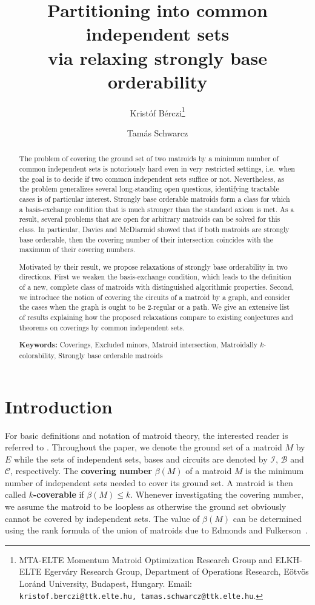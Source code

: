 \documentclass[11pt,a4paper]{article}
\title{Partitioning into common independent sets\\ via relaxing strongly base orderability}
\author{
Kristóf Bérczi\thanks{MTA-ELTE Momentum Matroid Optimization Research Group and ELKH-ELTE Egerváry Research Group, Department of Operations Research, Eötvös Loránd University, Budapest, Hungary. Email: \texttt{kristof.berczi@ttk.elte.hu, tamas.schwarcz@ttk.elte.hu}.}
\and
Tamás Schwarcz\footnotemark[1]
}
\date{}
\theoremstyle{plain}
\theoremstyle{definition}
\newcommand{\cB}{\mathcal{B}}
\newcommand{\cI}{\mathcal{I}}
\newcommand{\cC}{\mathcal{C}}
\begin{document}
\maketitle

\begin{abstract}

The problem of covering the ground set of two matroids by a minimum number of common independent sets is notoriously hard even in very restricted settings, i.e.\ when the goal is to decide if two common independent sets suffice or not. Nevertheless, as the problem generalizes several long-standing open questions, identifying tractable cases is of particular interest. Strongly base orderable matroids form a class for which a basis-exchange condition that is much stronger than the standard axiom is met. As a result, several problems that are open for arbitrary matroids can be solved for this class. In particular, Davies and McDiarmid showed that if both matroids are strongly base orderable, then the covering number of their intersection coincides with the maximum of their covering numbers.

Motivated by their result, we propose relaxations of strongly base orderability in two directions. First we weaken the basis-exchange condition, which leads to the definition of a new, complete class of matroids with distinguished algorithmic properties. Second, we introduce the notion of covering the circuits of a matroid by a graph, and consider the cases when the graph is ought to be 2-regular or a path. We give an extensive list of results explaining how the proposed relaxations compare to existing conjectures and theorems on coverings by common independent sets. 
   
    \medskip

\noindent \textbf{Keywords:} Coverings, Excluded minors, Matroid intersection, Matroidally $k$-colorability, Strongly base orderable matroids
    
\end{abstract}


\section{Introduction} 
\label{sec:intro}

For basic definitions and notation of matroid theory, the interested reader is referred to \cite{oxley2011matroid}. Throughout the paper, we denote the ground set of a matroid $M$ by $E$ while the sets of independent sets, bases and circuits are denoted by $\cI$, $\cB$ and $\cC$, respectively. The \textbf{covering number} $\beta(M)$ of a matroid $M$ is the minimum number of independent sets needed to cover its ground set. A matroid is then called \textbf{$k$-coverable} if $\beta(M)\leq k$. Whenever investigating the covering number, we assume the matroid to be loopless as otherwise the ground set obviously cannot be covered by independent sets. The value of $\beta(M)$ can be determined using the rank formula of the union of matroids due to Edmonds and Fulkerson~\cite{edmonds1965transversals}. 
\end{document}

